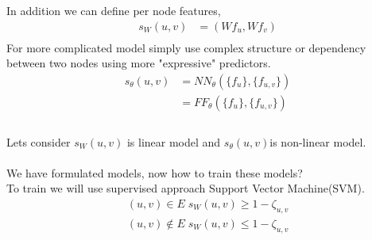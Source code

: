 \documentclass{article}
\begin{document}
In addition we can define per node features,
\begin{equation} \
\begin{split}
s_W(u, v) & =( W f_u, Wf_v) \\
\end{split}
\end{equation}
For more complicated model simply use complex structure or dependency between two nodes using more "expressive" predictors.\\
\begin{equation} \
\begin{split}
s_\theta(u, v) & =NN_\theta( \{f_u\}, \{f_{u, v}\}) \\
& = FF_\theta( \{f_u\}, \{f_{u, v}\}) \\
\end{split}
\end{equation}
\\
Lets consider $s_W(u, v)$ is linear model and $s_\theta(u, v) $is non-linear model.\\ \\
We have formulated models, now how to train these models? \\
To train we will use supervised approach Support Vector Machine(SVM).\\
\begin{equation} \
\begin{split}
(u, v) \in E \;   s_W(u, v ) \geq 1 - \zeta_{u, v} \\
(u, v) \notin E  \;  s_W(u, v ) \leq 1 - \zeta_{u, v} \\
\end{split}
\end{equation}
\end{document}
